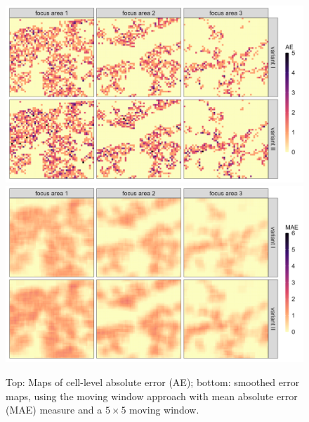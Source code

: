 \begin{figure}[H]
    \centering
    \includegraphics[width = \linewidth]{figures/CaseStudy_CKM/r_ilcell.png}
    \includegraphics[width = \linewidth]{figures/CaseStudy_CKM/r_il_mw.png}
    \caption{Top: Maps of cell-level absolute error (AE); bottom: smoothed error maps, using the moving window approach with mean absolute error (MAE) measure and a $5 \times 5$ moving window.}
    \label{fig:cs_ilcell_ilmw}
\end{figure}


